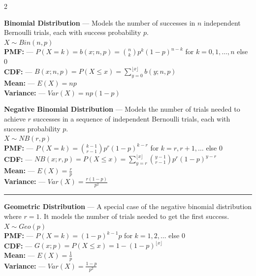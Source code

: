 \documentclass[10pt,letterpaper]{article}
\begin{document}
\begin{multicols}{2}
\vspace{1cm}

\textbf{Binomial Distribution} --- Models the number of successes in \( n \) independent Bernoulli trials, each with success probability \( p \).\\
$X \sim Bin(n, p)$\\
\textbf{PMF:} --- $P(X = k) = b(x; n,p) = \binom{n}{k} p^k (1-p)^{n-k}$ for $ k = 0, 1, \ldots, n $ else $0$\\
\textbf{CDF:} --- $B(x; n,p) = P(X \leq x) = \sum_{y=0}^{\lfloor x \rfloor} b(y; n,p)$\\
\textbf{Mean:} --- $E(X) = np$\\
\textbf{Variance:} --- $Var(X) = np(1-p)$

\vspace{0.2cm}

\textbf{Negative Binomial Distribution} --- Models the number of trials needed to achieve \( r \) successes in a sequence of independent Bernoulli trials, 
each with success probability \( p \).\\
$X \sim NB(r, p)$\\
\textbf{PMF:} --- $P(X = k) = \binom{k-1}{r-1} p^r (1-p)^{k-r}$ for $ k = r, r+1, \ldots $ else $0$\\
\textbf{CDF:} --- $NB(x; r,p) = P(X \leq x) = \sum_{y=r}^{\lfloor x \rfloor} \binom{y-1}{r-1} p^r (1-p)^{y-r}$\\
\textbf{Mean:} --- $E(X) = \frac{r}{p}$\\
\textbf{Variance:} --- $Var(X) = \frac{r(1-p)}{p^2}$

\vspace{0.1cm}
\hrule
\vspace{0.1cm}

\textbf{Geometric Distribution} --- A special case of the negative binomial distribution where \( r = 1 \). 
It models the number of trials needed to get the first success.\\
$X \sim Geo(p)$\\
\textbf{PMF:} --- $P(X = k) = (1-p)^{k-1} p$ for $ k = 1, 2, \ldots $ else $0$\\
\textbf{CDF:} --- $G(x; p) = P(X \leq x) = 1 - (1-p)^{\lfloor x \rfloor}$\\
\textbf{Mean:} --- $E(X) = \frac{1}{p}$\\
\textbf{Variance:} --- $Var(X) = \frac{1-p}{p^2}$


\end{multicols}
\end{document}

